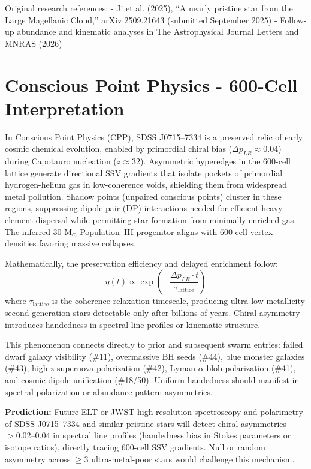 \documentclass[11pt]{article}
\begin{document}
Original research references:  
- Ji et al. (2025), ``A nearly pristine star from the Large Magellanic Cloud,'' arXiv:2509.21643 (submitted September 2025)  
- Follow-up abundance and kinematic analyses in The Astrophysical Journal Letters and MNRAS (2026)

\section{Conscious Point Physics - 600-Cell Interpretation}
In Conscious Point Physics (CPP), SDSS J0715--7334 is a preserved relic of early cosmic chemical evolution, enabled by primordial chiral bias ($\Delta p_{LR} \approx 0.04$) during Capotauro nucleation ($z \approx 32$). Asymmetric hyperedges in the 600-cell lattice generate directional SSV gradients that isolate pockets of primordial hydrogen-helium gas in low-coherence voids, shielding them from widespread metal pollution. Shadow points (unpaired conscious points) cluster in these regions, suppressing dipole-pair (DP) interactions needed for efficient heavy-element dispersal while permitting star formation from minimally enriched gas. The inferred 30 M$_\odot$ Population~III progenitor aligns with 600-cell vertex densities favoring massive collapses.

Mathematically, the preservation efficiency and delayed enrichment follow:  
\[
\eta(t) \propto \exp\left(-\frac{\Delta p_{LR} \cdot t}{\tau_{\text{lattice}}}\right)
\]  
where $\tau_{\text{lattice}}$ is the coherence relaxation timescale, producing ultra-low-metallicity second-generation stars detectable only after billions of years. Chiral asymmetry introduces handedness in spectral line profiles or kinematic structure.

This phenomenon connects directly to prior and subsequent swarm entries: failed dwarf galaxy visibility (\#11), overmassive BH seeds (\#44), blue monster galaxies (\#43), high-z supernova polarization (\#42), Lyman-$\alpha$ blob polarization (\#41), and cosmic dipole unification (\#18/50). Uniform handedness should manifest in spectral polarization or abundance pattern asymmetries.

\textbf{Prediction:} Future ELT or JWST high-resolution spectroscopy and polarimetry of SDSS J0715--7334 and similar pristine stars will detect chiral asymmetries $> 0.02$--$0.04$ in spectral line profiles (handedness bias in Stokes parameters or isotope ratios), directly tracing 600-cell SSV gradients. Null or random asymmetry across $\geq 3$ ultra-metal-poor stars would challenge this mechanism.
\end{document}
